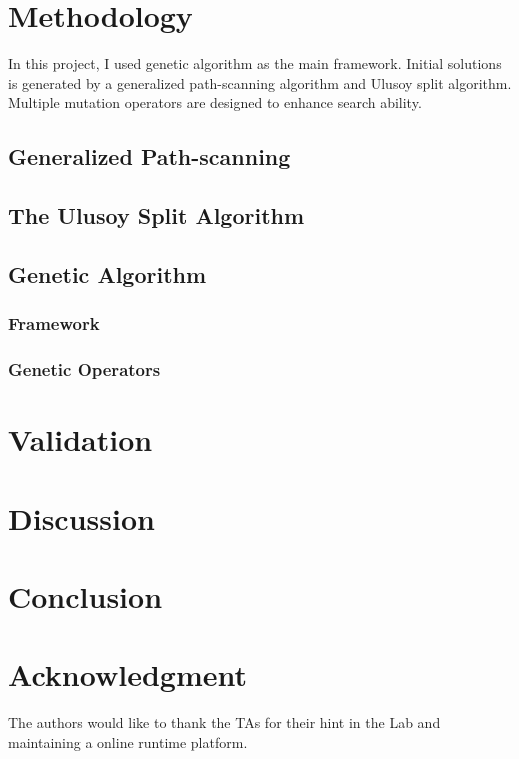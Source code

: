 \documentclass[conference]{IEEEtran}
\begin{document}
\section{Methodology}

In this project, I used genetic algorithm as the main framework. Initial solutions is generated by a generalized path-scanning algorithm and Ulusoy split algorithm. Multiple mutation operators are designed to enhance search ability.
\subsection{Generalized Path-scanning}


\subsection{The Ulusoy Split Algorithm}



\subsection{Genetic Algorithm}
    \subsubsection{Framework}
    \subsubsection{Genetic Operators}

\section{Validation}
	 
\section{Discussion}


\section{Conclusion}

\section*{Acknowledgment}

The authors would like to thank the TAs for their hint in the Lab and maintaining a online runtime platform. 







\end{document}
